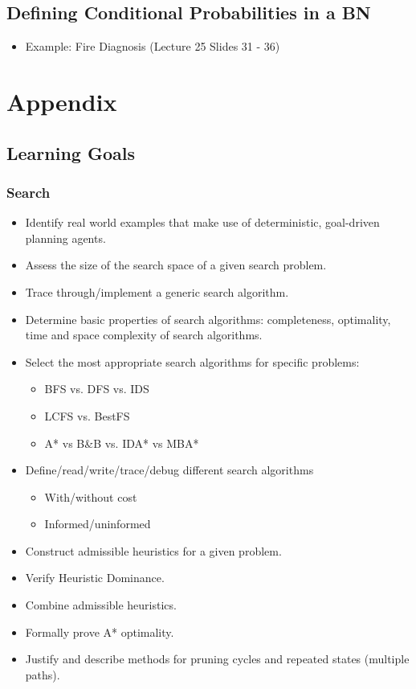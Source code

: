 \documentclass{article}
\begin{document}
\subsection{Defining Conditional Probabilities in a BN}

\begin{itemize}
    \item Example: Fire Diagnosis (Lecture 25 Slides 31 - 36)
\end{itemize}

\section{Appendix}

\subsection{Learning Goals}

\subsubsection*{Search}

\begin{itemize}
    \item Identify real world examples that make use of deterministic, goal-driven planning agents.
    \item Assess the size of the search space of a given search problem.
    \item Trace through/implement a generic search algorithm.
    \item Determine basic properties of search algorithms: completeness, optimality, time and space complexity of search algorithms.
    \item Select the most appropriate search algorithms for specific problems:
        \begin{itemize}
            \item BFS vs. DFS vs. IDS
            \item LCFS vs. BestFS
            \item A* vs B\&B vs. IDA* vs MBA*
        \end{itemize}
    \item Define/read/write/trace/debug different search algorithms
        \begin{itemize}
            \item With/without cost
            \item Informed/uninformed
        \end{itemize}
    \item Construct admissible heuristics for a given problem.
    \item Verify Heuristic Dominance.
    \item Combine admissible heuristics.
    \item Formally prove A* optimality.
    \item Justify and describe methods for pruning cycles and repeated states (multiple paths).
\end{itemize}
\end{document}
